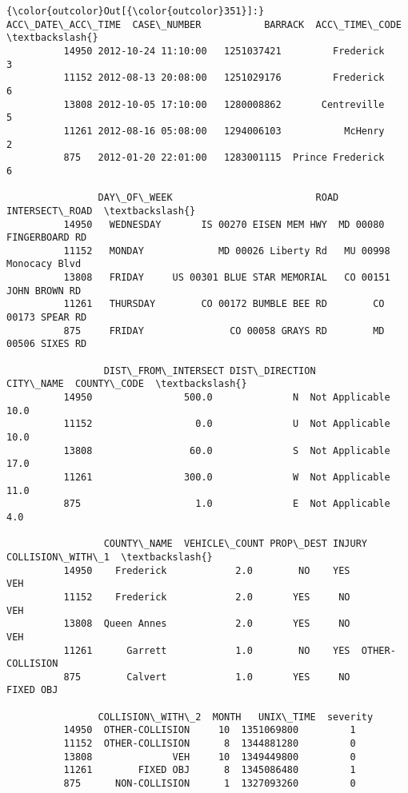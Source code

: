 \documentclass[11pt]{article}
\begin{document}
\begin{Verbatim}[commandchars=\\\{\}]
{\color{outcolor}Out[{\color{outcolor}351}]:}         ACC\_DATE\_ACC\_TIME  CASE\_NUMBER           BARRACK  ACC\_TIME\_CODE  \textbackslash{}
          14950 2012-10-24 11:10:00   1251037421         Frederick              3   
          11152 2012-08-13 20:08:00   1251029176         Frederick              6   
          13808 2012-10-05 17:10:00   1280008862       Centreville              5   
          11261 2012-08-16 05:08:00   1294006103           McHenry              2   
          875   2012-01-20 22:01:00   1283001115  Prince Frederick              6   
          
                DAY\_OF\_WEEK                         ROAD           INTERSECT\_ROAD  \textbackslash{}
          14950   WEDNESDAY       IS 00270 EISEN MEM HWY  MD 00080 FINGERBOARD RD   
          11152   MONDAY             MD 00026 Liberty Rd   MU 00998 Monocacy Blvd   
          13808   FRIDAY     US 00301 BLUE STAR MEMORIAL   CO 00151 JOHN BROWN RD   
          11261   THURSDAY        CO 00172 BUMBLE BEE RD        CO 00173 SPEAR RD   
          875     FRIDAY               CO 00058 GRAYS RD        MD 00506 SIXES RD   
          
                 DIST\_FROM\_INTERSECT DIST\_DIRECTION       CITY\_NAME  COUNTY\_CODE  \textbackslash{}
          14950                500.0              N  Not Applicable         10.0   
          11152                  0.0              U  Not Applicable         10.0   
          13808                 60.0              S  Not Applicable         17.0   
          11261                300.0              W  Not Applicable         11.0   
          875                    1.0              E  Not Applicable          4.0   
          
                 COUNTY\_NAME  VEHICLE\_COUNT PROP\_DEST INJURY COLLISION\_WITH\_1  \textbackslash{}
          14950    Frederick            2.0        NO    YES              VEH   
          11152    Frederick            2.0       YES     NO              VEH   
          13808  Queen Annes            2.0       YES     NO              VEH   
          11261      Garrett            1.0        NO    YES  OTHER-COLLISION   
          875        Calvert            1.0       YES     NO        FIXED OBJ   
          
                COLLISION\_WITH\_2  MONTH   UNIX\_TIME  severity  
          14950  OTHER-COLLISION     10  1351069800         1  
          11152  OTHER-COLLISION      8  1344881280         0  
          13808              VEH     10  1349449800         0  
          11261        FIXED OBJ      8  1345086480         1  
          875      NON-COLLISION      1  1327093260         0  
\end{Verbatim}
            
\end{document}
